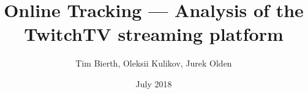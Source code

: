 \documentclass[12pt, a4paper]{article}
\title{Online Tracking --- Analysis of the TwitchTV streaming platform}
\author{Tim Bierth, Oleksii Kulikov, Jurek Olden}
\date{July 2018}
\begin{document}
\begin{titlepage}
\maketitle
\end{titlepage}











%






\clearpage
\begin{appendices}
	
\end{appendices}
\end{document}
